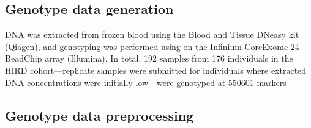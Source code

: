 \subsection{Genotype data generation}
\label{subsec:hird_dge_genotype_data_generation}

DNA was extracted from frozen blood using the Blood and Tissue DNeasy kit (Qiagen), and genotyping was performed using on the Infinium CoreExome-24 BeadChip array (Illumina).
In total, 192 samples from 176 individuals in the \gls{HIRD} cohort---replicate samples were submitted for individuals where extracted DNA concentrations were initially low---were genotyped at \num{550601} markers

\subsection{Genotype data preprocessing}
\label{subsec:hird_dge_genotype_preproc}


